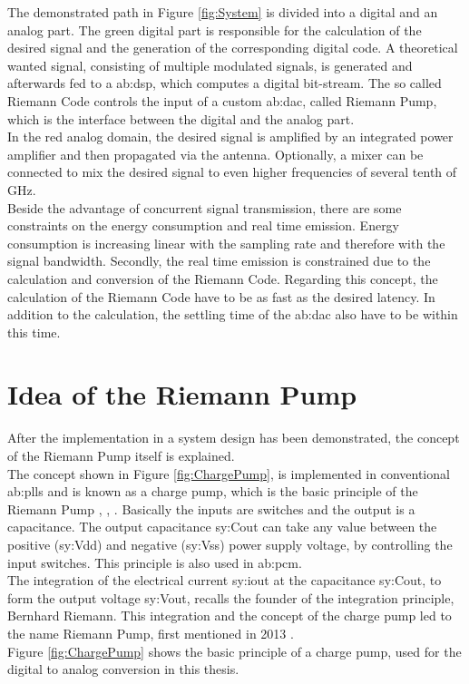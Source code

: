 The demonstrated path in Figure \ref{fig:System} is divided into a digital and an analog part.
The green digital part is responsible for the calculation of the desired signal and the generation of the corresponding digital code.
A theoretical wanted signal, consisting of multiple modulated signals, is generated and afterwards fed to a \gls{ab:dsp}, which computes a digital bit-stream.
The so called Riemann Code controls the input of a custom \gls{ab:dac}, called Riemann Pump, which is the interface between the digital and the analog part.\\
In the red analog domain, the desired signal is amplified by an integrated power amplifier and then propagated via the antenna.
Optionally, a mixer can be connected to mix the desired signal to even higher frequencies of several tenth of \si{\giga \hertz}.\\
Beside the advantage of concurrent signal transmission, there are some constraints on the energy consumption and real time emission.
Energy consumption is increasing linear with the sampling rate and therefore with the signal bandwidth.
Secondly, the real time emission is constrained due to the calculation and conversion of the Riemann Code.
Regarding this concept, the calculation of the Riemann Code have to be as fast as the desired latency.
In addition to the calculation, the settling time of the \gls{ab:dac} also have to be within this time.

\section{Idea of the Riemann Pump}
\label{IdeaRiemannPump}
After the implementation in a system design has been demonstrated, the concept of the Riemann Pump itself is explained.\\
The concept shown in Figure \ref{fig:ChargePump}, is implemented in conventional \glspl{ab:pll} and is known as a charge pump, which is the basic principle of the Riemann Pump \cite{DevalRivetVeyracEtAl2013}, \cite{VeyracRivetDevalEtAl2014}, \cite{DevalRivetVeyrac2015}.
Basically the inputs are switches and the output is a capacitance.
The output capacitance \gls{sy:Cout} can take any value between the positive (\gls{sy:Vdd}) and negative (\gls{sy:Vss}) power supply voltage, by controlling the input switches.
This principle is also used in \gls{ab:pcm}.\\
 The integration of the electrical current \gls{sy:iout} at the capacitance \gls{sy:Cout}, to form the output voltage \gls{sy:Vout}, recalls the founder of the integration principle, Bernhard Riemann.
This integration and the concept of the charge pump led to the name Riemann Pump, first mentioned in 2013 \cite{DevalRivetVeyracEtAl2013}. \\
Figure \ref{fig:ChargePump} shows the basic principle of a charge pump, used for the digital to analog conversion in this thesis.

